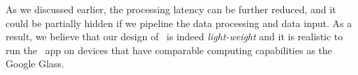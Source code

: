 As we discussed earlier, the processing latency can be further reduced, and it could be partially hidden if we pipeline the data processing and data input. As a result, we believe that our design of \systemname~is indeed \emph{light-weight} and it is realistic to run the \systemname~app on devices that have comparable computing capabilities as the Google Glass.

